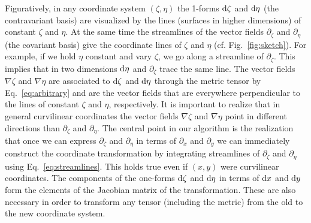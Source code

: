 Figuratively, in any coordinate system $(\zeta,\eta)$ the 1-forms $\mathrm{d} \zeta$ and $\mathrm{d} \eta$ (the contravariant basis) are visualized by the lines (surfaces in higher dimensions) 
of constant $\zeta$ and $\eta$. 
At the same time the streamlines of the vector fields $\partial_\zeta$ and $\partial_\eta$ (the covariant basis) 
give the coordinate lines of $\zeta$ and $\eta$ (cf. Fig.~\ref{fig:sketch}). 
For example, if we hold $\eta$ constant and vary $\zeta$, we go along a streamline of 
$\partial_\zeta$. This implies that in two dimensions $\mathrm{d} \eta$ and $\partial_\zeta$ 
trace the same line. The vector fields $\nabla \zeta$ and $\nabla \eta$ are associated to 
$\mathrm{d} \zeta$ and $\mathrm{d} \eta$ through the metric tensor by Eq.~\eqref{eq:arbitrary} and are the vector fields that
are everywhere perpendicular to the lines of constant $\zeta$ and $\eta$, respectively. 
It is important to realize that in general curvilinear coordinates the vector
fields $\nabla \zeta$ and $\nabla \eta$ point in 
different directions than $\partial_\zeta$ and $\partial_\eta$.
The central point in our algorithm is the realization that once we can 
express $\partial_\zeta$ and $\partial_\eta$ in terms of $\partial_x$ and 
$\partial_y$ we can immediately construct the coordinate transformation 
by integrating 
streamlines of $\partial_\zeta$ and $\partial_\eta$ using Eq.~\eqref{eq:streamlines}. This 
holds true even if $(x,y)$ were curvilinear coordinates. The components of the 
one-forms $\mathrm{d} \zeta$ and $\mathrm{d}\eta$ in terms of $\mathrm{d} x$ and $\mathrm{d} y$ form 
the elements of the Jacobian matrix of the transformation. These 
are also necessary in order to transform any tensor (including the metric) 
from the old to the new coordinate system. 


